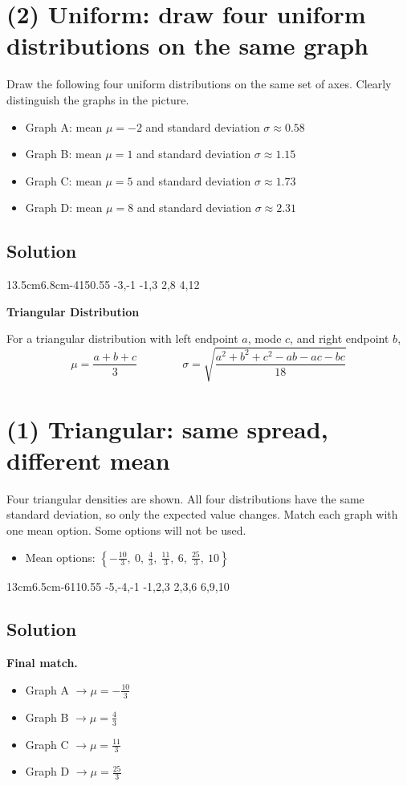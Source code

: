 \section{(2) Uniform: draw four uniform distributions on the same graph}
Draw the following four uniform distributions on the same set of axes. Clearly distinguish the graphs in the picture.
\begin{itemize}
\item Graph A: mean $\mu=-2$ and standard deviation $\sigma\approx0.58$
\item Graph B: mean $\mu=1$ and standard deviation $\sigma\approx1.15$
\item Graph C: mean $\mu=5$ and standard deviation $\sigma\approx1.73$
\item Graph D: mean $\mu=8$ and standard deviation $\sigma\approx2.31$
\end{itemize}
\subsection*{Solution}
\UniformFourGraph
{13.5cm}{6.8cm}{-4}{15}{0.55}
{-3,-1}
{-1,3}
{2,8}
{4,12}

\textbf{Triangular Distribution}

For a triangular distribution with left endpoint $a$, mode $c$, and right endpoint $b$,
\[
\mu=\frac{a+b+c}{3}
\qquad \qquad
\sigma=\sqrt{\frac{a^2+b^2+c^2-ab-ac-bc}{18}}
\]

\section{(1) Triangular: same spread, different mean}
Four triangular densities are shown. All four distributions have the same standard deviation, so only the expected value changes.
Match each graph with one mean option. Some options will not be used.
\begin{itemize}
\item Mean options: $\left\{-\frac{10}{3},\ 0,\ \frac{4}{3},\ \frac{11}{3},\ 6,\ \frac{25}{3},\ 10\right\}$
\end{itemize}
\TriangularFourGraph
{13cm}{6.5cm}{-6}{11}{0.55}
{-5,-4,-1}
{-1,2,3}
{2,3,6}
{6,9,10}

\subsection*{Solution}
\textbf{Final match.}
\begin{itemize}
\item Graph A $\to \mu=-\frac{10}{3}$
\item Graph B $\to \mu=\frac{4}{3}$
\item Graph C $\to \mu=\frac{11}{3}$
\item Graph D $\to \mu=\frac{25}{3}$
\end{itemize}

